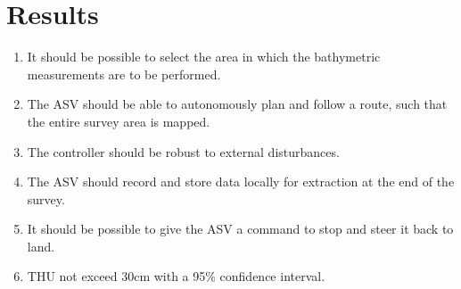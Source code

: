 \chapter{Results}\label{chap:results}

\begin{enumerate}
    \item It should be possible to select the area in which the bathymetric measurements are to be performed.
    \item The ASV should be able to autonomously plan and follow a route, such that the entire survey area is mapped.
    \item The controller should be robust to external disturbances.
    \item The ASV should record and store data locally for extraction at the end of the survey.
    \item It should be possible to give the ASV a command to stop and steer it back to land.
    \item THU not exceed 30cm with a 95\% confidence interval.
\end{enumerate}